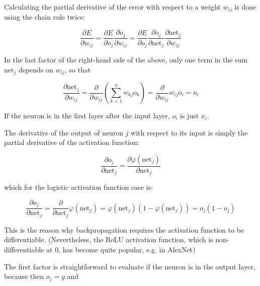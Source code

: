 Calculating the partial derivative of the error with respect to a weight $w_{ij}$ is done using the chain rule twice:

\begin{equation}
    \label{eq:chain-1}
    {\frac {\partial E}{\partial w_{ij}}}={\frac {\partial E}{\partial o_{j}}}{\frac {\partial o_{j}}{\partial w_{ij}}}={\frac {\partial E}{\partial o_{j}}}{\frac {\partial o_{j}}{\partial {\text{net}}_{j}}}{\frac {\partial {\text{net}}_{j}}{\partial w_{ij}}}
\end{equation}

In the last factor of the right-hand side of the above, only one term in the sum ${\text{net}}_{j}$ depends on $w_{ij}$, so that

\begin{equation}
    \label{eq:chain-2}
    {\frac {\partial {\text{net}}_{j}}{\partial w_{ij}}}={\frac {\partial }{\partial w_{ij}}}\left(\sum _{k=1}^{n}w_{kj}o_{k}\right)={\frac {\partial }{\partial w_{ij}}}w_{ij}o_{i}=o_{i}
\end{equation}

If the neuron is in the first layer after the input layer, $o_{i}$ is just $x_{i}$.

The derivative of the output of neuron $j$ with respect to its input is simply the partial derivative of the activation function:

\begin{equation}
    \label{eq:chain-3}
    {\frac {\partial o_{j}}{\partial {\text{net}}_{j}}}={\frac {\partial \varphi ({\text{net}}_{j})}{\partial {\text{net}}_{j}}}
\end{equation}

which for the logistic activation function case is:

\begin{equation}
    \label{eq:chain-4}
    {\frac {\partial o_{j}}{\partial {\text{net}}_{j}}}={\frac {\partial }{\partial {\text{net}}_{j}}}\varphi ({\text{net}}_{j})=\varphi ({\text{net}}_{j})(1-\varphi ({\text{net}}_{j}))=o_{j}(1-o_{j})
\end{equation}

This is the reason why backpropagation requires the activation function to be differentiable. (Nevertheless, the ReLU activation function, which is non-differentiable at 0, has become quite popular, e.g. in AlexNet)

The first factor is straightforward to evaluate if the neuron is in the output layer, because then $o_j = y$ and

